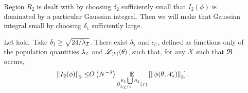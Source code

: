 Region $R_2$ is dealt with by choosing $\delta_2$ sufficiently small that
$I_2(\phi)$ is dominated by a particular Gaussian integral.  Then we will make
that Gaussian integral small by choosing $\delta_1$ sufficiently large.

\begin{lem}
%
Let  hold. Take $\delta_1 \ge \sqrt{24 / \lambda_\mathcal{I}}$.
There exist $\delta_2$ and $\epsilon_U$, defined as functions only of the
population quantities $\lambda_\mathcal{I}$ and $\mathscr{L}_{(k)}(\theta)$, such that, for any
${\mathcal{X}}$ such that $\mathfrak{R}$ occurs,
%
\begin{align*}
%
\norm{I_2(\phi)}_2 \le&
    O\left(N^{-3}\right)
    \expect{\normresid{\infoev / 4}{R_1 \bigcup R_2}(\tau)}
           {\norm{\phi(\theta, \xvec_s)}_2 }.
\end{align*}
%
\end{lem}
%
